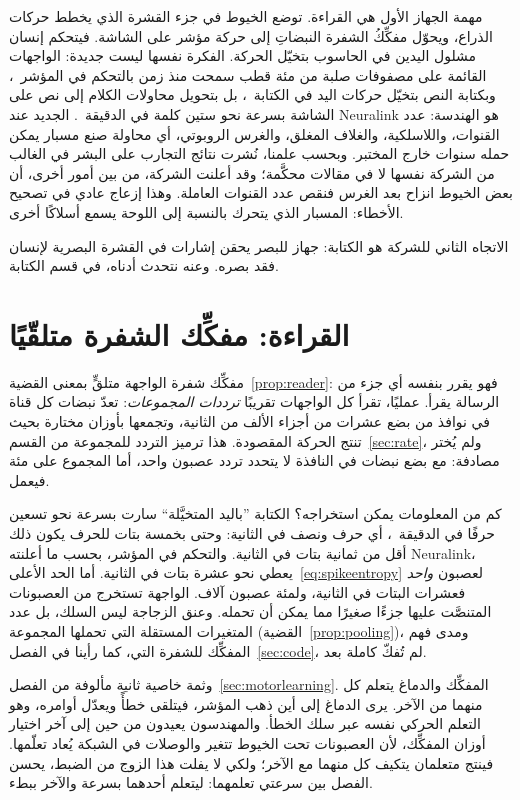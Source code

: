 مهمة الجهاز الأول هي القراءة. توضع الخيوط في جزء القشرة الذي يخطط حركات الذراع، ويحوّل مفكِّكُ الشفرة النبضاتِ إلى حركة مؤشر على الشاشة. فيتحكم إنسان مشلول اليدين في الحاسوب بتخيّل الحركة. الفكرة نفسها ليست جديدة: الواجهات القائمة على مصفوفات صلبة من مئة قطب سمحت منذ زمن بالتحكم في المؤشر~\cite{Hochberg2006}، وبكتابة النص بتخيّل حركات اليد في الكتابة~\cite{Willett2021}، بل بتحويل محاولات الكلام إلى نص على الشاشة بسرعة نحو ستين كلمة في الدقيقة~\cite{Willett2023}. الجديد عند \foreignlanguage{english}{Neuralink} هو الهندسة: عدد القنوات، واللاسلكية، والغلاف المغلق، والغرس الروبوتي، أي محاولة صنع مسبار يمكن حمله سنوات خارج المختبر. وبحسب علمنا، نُشرت نتائج التجارب على البشر في الغالب من الشركة نفسها لا في مقالات محكَّمة؛ وقد أعلنت الشركة، من بين أمور أخرى، أن بعض الخيوط انزاح بعد الغرس فنقص عدد القنوات العاملة. وهذا إزعاج عادي في تصحيح الأخطاء: المسبار الذي يتحرك بالنسبة إلى اللوحة يسمع أسلاكًا أخرى.

الاتجاه الثاني للشركة هو الكتابة: جهاز للبصر يحقن إشارات في القشرة البصرية لإنسان فقد بصره. وعنه نتحدث أدناه، في قسم الكتابة.

\section{القراءة: مفكِّك الشفرة متلقّيًا}

مفكِّك شفرة الواجهة متلقٍّ بمعنى القضية~\ref{prop:reader}: فهو يقرر بنفسه أي جزء من الرسالة يقرأ. عمليًا، تقرأ كل الواجهات تقريبًا \emph{ترددات المجموعات}: تعدّ نبضات كل قناة في نوافذ من بضع عشرات من أجزاء الألف من الثانية، وتجمعها بأوزان مختارة بحيث تنتج الحركة المقصودة. هذا ترميز التردد للمجموعة من القسم~\ref{sec:rate}، ولم يُختر مصادفة: مع بضع نبضات في النافذة لا يتحدد تردد عصبون واحد، أما المجموع على مئة فيعمل.

كم من المعلومات يمكن استخراجه؟ الكتابة ”باليد المتخيَّلة“ سارت بسرعة نحو تسعين حرفًا في الدقيقة~\cite{Willett2021}، أي حرف ونصف في الثانية: وحتى بخمسة بتات للحرف يكون ذلك أقل من ثمانية بتات في الثانية. والتحكم في المؤشر، بحسب ما أعلنته \foreignlanguage{english}{Neuralink}، يعطي نحو عشرة بتات في الثانية. أما الحد الأعلى~\eqref{eq:spikeentropy} لعصبون \emph{واحد} فعشرات البتات في الثانية، ولمئة عصبون آلاف. الواجهة تستخرج من العصبونات المتنصَّت عليها جزءًا صغيرًا مما يمكن أن تحمله. وعنق الزجاجة ليس السلك، بل عدد المتغيرات المستقلة التي تحملها المجموعة (القضية~\ref{prop:pooling})، ومدى فهم المفكِّك للشفرة التي، كما رأينا في الفصل~\ref{sec:code}، لم تُفكّ كاملة بعد.

وثمة خاصية ثانية مألوفة من الفصل~\ref{sec:motorlearning}. المفكِّك والدماغ يتعلم كل منهما من الآخر. يرى الدماغ إلى أين ذهب المؤشر، فيتلقى خطأً ويعدّل أوامره، وهو التعلم الحركي نفسه عبر سلك الخطأ. والمهندسون يعيدون من حين إلى آخر اختيار أوزان المفكِّك، لأن العصبونات تحت الخيوط تتغير والوصلات في الشبكة يُعاد تعلّمها. فينتج متعلمان يتكيف كل منهما مع الآخر؛ ولكي لا يفلت هذا الزوج من الضبط، يحسن الفصل بين سرعتي تعلمهما: ليتعلم أحدهما بسرعة والآخر ببطء.

